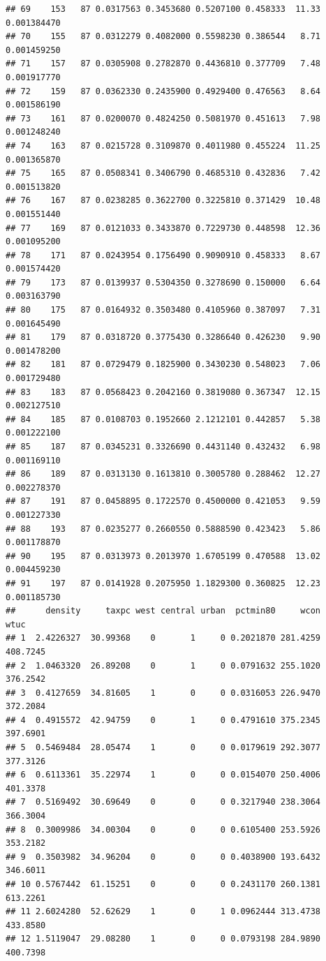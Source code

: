 \documentclass[]{article}
\begin{document}
\begin{verbatim}
## 69    153   87 0.0317563 0.3453680 0.5207100 0.458333  11.33 0.001384470
## 70    155   87 0.0312279 0.4082000 0.5598230 0.386544   8.71 0.001459250
## 71    157   87 0.0305908 0.2782870 0.4436810 0.377709   7.48 0.001917770
## 72    159   87 0.0362330 0.2435900 0.4929400 0.476563   8.64 0.001586190
## 73    161   87 0.0200070 0.4824250 0.5081970 0.451613   7.98 0.001248240
## 74    163   87 0.0215728 0.3109870 0.4011980 0.455224  11.25 0.001365870
## 75    165   87 0.0508341 0.3406790 0.4685310 0.432836   7.42 0.001513820
## 76    167   87 0.0238285 0.3622700 0.3225810 0.371429  10.48 0.001551440
## 77    169   87 0.0121033 0.3433870 0.7229730 0.448598  12.36 0.001095200
## 78    171   87 0.0243954 0.1756490 0.9090910 0.458333   8.67 0.001574420
## 79    173   87 0.0139937 0.5304350 0.3278690 0.150000   6.64 0.003163790
## 80    175   87 0.0164932 0.3503480 0.4105960 0.387097   7.31 0.001645490
## 81    179   87 0.0318720 0.3775430 0.3286640 0.426230   9.90 0.001478200
## 82    181   87 0.0729479 0.1825900 0.3430230 0.548023   7.06 0.001729480
## 83    183   87 0.0568423 0.2042160 0.3819080 0.367347  12.15 0.002127510
## 84    185   87 0.0108703 0.1952660 2.1212101 0.442857   5.38 0.001222100
## 85    187   87 0.0345231 0.3326690 0.4431140 0.432432   6.98 0.001169110
## 86    189   87 0.0313130 0.1613810 0.3005780 0.288462  12.27 0.002278370
## 87    191   87 0.0458895 0.1722570 0.4500000 0.421053   9.59 0.001227330
## 88    193   87 0.0235277 0.2660550 0.5888590 0.423423   5.86 0.001178870
## 90    195   87 0.0313973 0.2013970 1.6705199 0.470588  13.02 0.004459230
## 91    197   87 0.0141928 0.2075950 1.1829300 0.360825  12.23 0.001185730
##      density     taxpc west central urban  pctmin80     wcon     wtuc
## 1  2.4226327  30.99368    0       1     0 0.2021870 281.4259 408.7245
## 2  1.0463320  26.89208    0       1     0 0.0791632 255.1020 376.2542
## 3  0.4127659  34.81605    1       0     0 0.0316053 226.9470 372.2084
## 4  0.4915572  42.94759    0       1     0 0.4791610 375.2345 397.6901
## 5  0.5469484  28.05474    1       0     0 0.0179619 292.3077 377.3126
## 6  0.6113361  35.22974    1       0     0 0.0154070 250.4006 401.3378
## 7  0.5169492  30.69649    0       0     0 0.3217940 238.3064 366.3004
## 8  0.3009986  34.00304    0       0     0 0.6105400 253.5926 353.2182
## 9  0.3503982  34.96204    0       0     0 0.4038900 193.6432 346.6011
## 10 0.5767442  61.15251    0       0     0 0.2431170 260.1381 613.2261
## 11 2.6024280  52.62629    1       0     1 0.0962444 313.4738 433.8580
## 12 1.5119047  29.08280    1       0     0 0.0793198 284.9890 400.7398

\end{verbatim}
\end{document}

